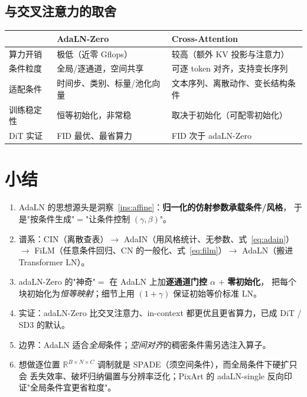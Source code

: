 \documentclass[11pt]{ctexart}
\newcommand{\R}{\mathbb{R}}
\theoremstyle{definition}
\begin{document}
\subsection{与交叉注意力的取舍}
\begin{table}[h]
\centering\small
\renewcommand{\arraystretch}{1.25}
\begin{tabularx}{\textwidth}{@{}l X X@{}}
\toprule
 & \textbf{AdaLN-Zero} & \textbf{Cross-Attention} \\
\midrule
算力开销   & 极低（近零 Gflops）          & 较高（额外 KV 投影与注意力）\\
条件粒度   & 全局/逐通道，空间共享        & 可逐 token 对齐，支持变长序列 \\
适配条件   & 时间步、类别、标量/池化向量  & 文本序列、离散动作、变长结构条件 \\
训练稳定性 & 恒等初始化，非常稳            & 取决于初始化（可配零初始化）\\
DiT 实证   & FID 最优、最省算力           & FID 次于 adaLN-Zero \\
\bottomrule
\end{tabularx}
\end{table}

\section{小结}

\begin{enumerate}[label=\textbf{\arabic*.}]
  \item AdaLN 的思想源头是洞察~\ref{ins:affine}：\textbf{归一化的仿射参数承载条件/风格}，
        于是"按条件生成"$=$"让条件控制 $(\gamma,\beta)$"。
  \item 谱系：CIN（离散查表）$\to$ AdaIN（用风格统计、无参数、式~\eqref{eq:adain}）$\to$
        FiLM（任意条件回归、CN 的一般化、式~\eqref{eq:film}）$\to$ AdaLN（搬进 Transformer LN）。
  \item adaLN-Zero 的"神奇"$=$ 在 AdaLN 上加\textbf{逐通道门控 $\alpha$} $+$ \textbf{零初始化}，
        把每个块初始化为\emph{恒等映射}；细节上用 $(1+\gamma)$ 保证初始等价标准 LN。
  \item 实证：adaLN-Zero 比交叉注意力、in-context 都更优且更省算力，已成 DiT / SD3 的默认。
  \item 边界：AdaLN 适合\emph{全局}条件；\emph{空间对齐}的稠密条件需另选注入算子。
  \item 想做逐位置 $\R^{B\times N\times C}$ 调制就是 SPADE（须空间条件），而全局条件下硬扩只会
        丢失效率、破坏归纳偏置与分辨率泛化；PixArt 的 adaLN-single 反向印证"全局条件宜更省粒度"。
\end{enumerate}
\end{document}
